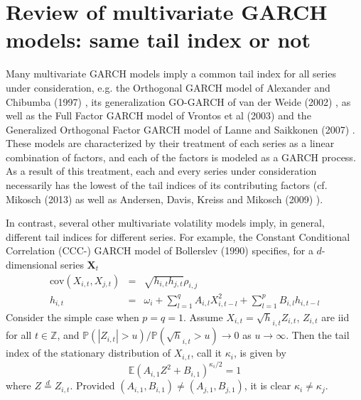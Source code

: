 \documentclass{article}
\newcommand{\E}{
  \mathbb{E}
}
\renewcommand{\P}{
  \mathbb{P}
}
\newcommand{\1}[1]{
  \mathbf{1}_{\{#1\}}
}
\renewcommand\vec[1]{
  \mathbf{#1}
}
\newcommand\cov{
  \text{cov}
}
\begin{document}
\section{Review of multivariate GARCH models:
  same tail index or not}
Many multivariate GARCH models imply a common tail index for all
series under consideration, e.g. the Orthogonal GARCH model of
Alexander and Chibumba (1997) \cite{alexander1997multivariate}, its
generalization GO-GARCH of van der Weide (2002) \cite{van2002go}, as
well as the Full Factor GARCH model of Vrontos et al (2003)
\cite{vrontos2003full} and the Generalized Orthogonal Factor GARCH
model of Lanne and Saikkonen (2007) \cite{lanne2007modeling}. These
models are characterized by their treatment of each series as a linear
combination of factors, and each of the factors is modeled as a GARCH
process. As a result of this treatment, each and every series under
consideration necessarily has the lowest of the tail indices of its
contributing factors (cf. Mikosch (2013) \cite{Mikosch2013} as well
as Andersen, Davis, Kreiss and Mikosch (2009)
\cite{andersen2009handbook}).

In contrast, several other multivariate volatility models imply, in
general, different tail indices for different series. For example, the
Constant Conditional Correlation (CCC-) GARCH model of Bollerslev
(1990) \cite{bollerslev1990modelling} specifies, for a $d$-dimensional
series $\vec X_t$
\begin{eqnarray}
  \cov(X_{i,t}, X_{j,t}) &=& \sqrt{h_{i,t} h_{j,t}} \rho_{i,j}
  \nonumber \\
  h_{i,t} &=& \omega_i + \sum_{l=1}^q A_{i,l} X_{i, t-l}^2 +
  \sum_{l=1}^p B_{i,l} h_{i, t-l} \label{eq:CCC-GARCH}
\end{eqnarray}
Consider the simple case when $p=q=1$. Assume
$X_{i, t} = \sqrt h_{i,t} Z_{i,t}$, $Z_{i, t}$ are iid for
all $t \in \mathbb Z$, and $\P(|Z_{i,t}| > u)/\P(\sqrt h_{i,t} > u) \to 0$ as
$u \to \infty$. Then the tail index of the stationary distribution of
$X_{i,t}$, call it $\kappa_i$, is given by
\[
\E (A_{i, 1} Z^2 + B_{i, 1})^{\kappa_i / 2} = 1
\]
where $Z \overset{d}{=} Z_{i,t}$.
Provided $(A_{i,1}, B_{i,1}) \neq (A_{j,1}, B_{j,1})$, it is clear
$\kappa_i \neq \kappa_j$.
\end{document}

